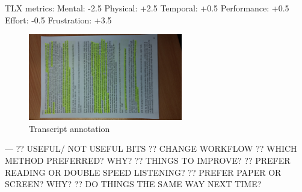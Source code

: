 TLX metrics:
Mental: -2.5
Physical: +2.5
Temporal: +0.5
Performance: +0.5
Effort: -0.5
Frustration: +3.5

\begin{figure}[ht]
  \centering
  \includegraphics[width=0.6\textwidth]{figs/study2-participantB-printout.jpg}
  \caption{Transcript annotation}
  \label{fig:study2-participantB-printout}
\end{figure}

---
?? USEFUL/ NOT USEFUL BITS
?? CHANGE WORKFLOW
?? WHICH METHOD PREFERRED? WHY?
?? THINGS TO IMPROVE?
?? PREFER READING OR DOUBLE SPEED LISTENING?
?? PREFER PAPER OR SCREEN? WHY?
?? DO THINGS THE SAME WAY NEXT TIME?

